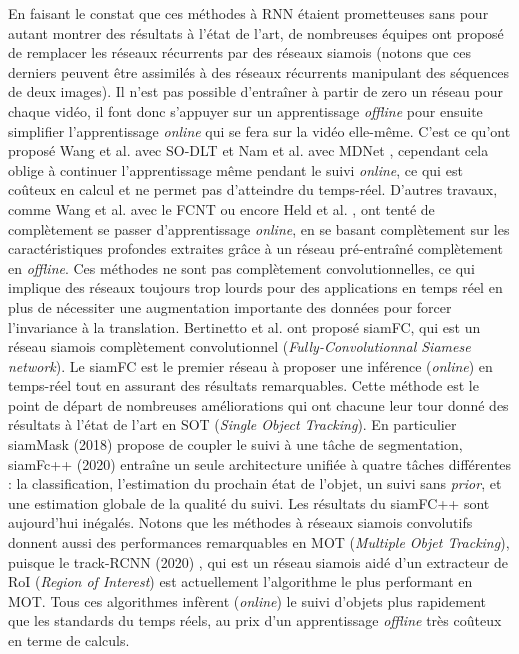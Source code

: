 \documentclass[10pt,twocolumn,letterpaper,french]{article}
\begin{document}
En faisant le constat que ces méthodes à RNN étaient prometteuses sans pour autant montrer des résultats à l'état de l'art, de nombreuses équipes ont proposé de remplacer les réseaux récurrents par des réseaux siamois (notons que ces derniers peuvent être assimilés à des réseaux récurrents manipulant des séquences de deux images). Il n'est pas possible d’entraîner à partir de zero un réseau pour chaque vidéo, il font donc s'appuyer sur un apprentissage \textit{offline} pour ensuite simplifier l'apprentissage \textit{online} qui se fera sur la vidéo elle-même. C'est ce qu'ont proposé Wang et al. avec SO-DLT \cite{wang2015transferring} et Nam et al. avec MDNet \cite{nam2016learning}, cependant cela oblige à continuer l'apprentissage même pendant le suivi \textit{online}, ce qui est coûteux en calcul et ne permet pas d'atteindre du temps-réel. D'autres travaux, comme Wang et al. avec le FCNT \cite{Wang} ou encore Held et al. \cite{held2016learning}, ont tenté de complètement se passer d'apprentissage \textit{online}, en se basant complètement sur les caractéristiques profondes extraites grâce à un réseau pré-entraîné complètement en \textit{offline}. Ces méthodes ne sont pas complètement convolutionnelles, ce qui implique des réseaux toujours trop lourds pour des applications en temps réel en plus de nécessiter une augmentation importante des données pour forcer l'invariance à la translation. Bertinetto et al. \cite{siamfc} ont proposé siamFC, qui est un réseau siamois complètement convolutionnel (\textit{Fully-Convolutionnal Siamese network}). Le siamFC est le premier réseau à proposer une inférence (\textit{online}) en temps-réel tout en assurant des résultats remarquables. Cette méthode est le point de départ de nombreuses améliorations qui ont chacune leur tour donné des résultats à l'état de l'art en SOT (\textit{Single Object Tracking}). En particulier  siamMask (2018) \cite{siamMask}  propose de coupler le suivi à une tâche de segmentation, siamFc++ (2020) \cite{siamfcplusplus}  entraîne un seule architecture unifiée à quatre tâches différentes : la classification, l'estimation du prochain état de l'objet, un suivi sans \textit{prior}, et une estimation globale de la qualité du suivi. Les résultats du siamFC++ sont aujourd'hui inégalés. Notons que les méthodes à réseaux siamois convolutifs donnent aussi des performances remarquables en MOT (\textit{Multiple Objet Tracking}), puisque le track-RCNN (2020)  \cite{trackRCNN}, qui est un réseau siamois aidé d'un extracteur de RoI (\textit{Region of Interest}) est actuellement l'algorithme le plus performant en MOT. Tous ces algorithmes infèrent (\textit{online}) le suivi d'objets plus rapidement que les standards du temps réels, au prix d'un apprentissage \textit{offline} très coûteux en terme de calculs.
\end{document}
